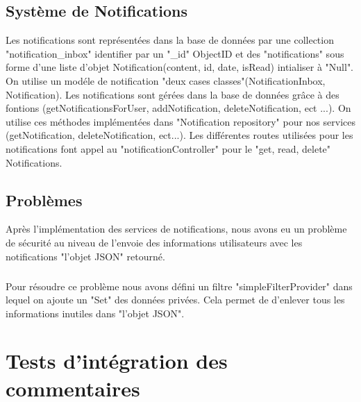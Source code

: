\subsection{Système de Notifications}
Les notifications sont représentées dans la base de données par une collection "notification\_inbox" identifier par un "\_id" ObjectID et des "notifications" sous forme d'une liste d'objet Notification(content, id, date, isRead) intialiser à "Null".
On utilise un modéle de notification "deux cases classes"(NotificationInbox, Notification).
Les notifications sont gérées dans la base de données grâce à des fontions (getNotificationsForUser, addNotification, deleteNotification, ect ...).
On utilise ces méthodes implémentées dans "Notification repository" pour nos services (getNotification, deleteNotification, ect...).
Les différentes routes utilisées pour les notifications font appel au "notificationController" pour le "get, read, delete" Notifications.
\subsection{Problèmes}
Après l'implémentation des services de notifications, nous avons eu un problème de sécurité au niveau de l'envoie des informations utilisateurs avec les notifications "l'objet JSON" retourné.
\subparagraph{}
Pour résoudre ce problème nous avons défini un filtre "simpleFilterProvider" dans lequel on ajoute un "Set" des données privées. Cela permet de d'enlever tous les informations inutiles dans "l'objet JSON".


\section{Tests d'intégration des commentaires}
